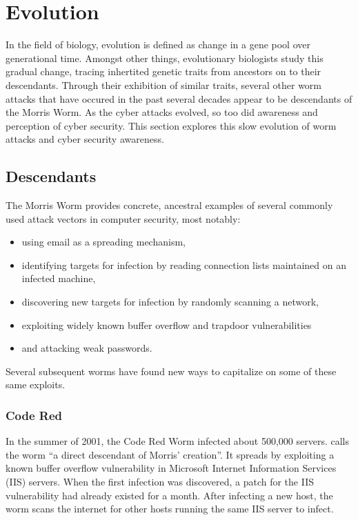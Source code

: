 \section*{Evolution}
In the field of biology, evolution is defined as change in a gene pool over
generational time. Amongst other things, evolutionary biologists study this
gradual change, tracing inhertited genetic traits from ancestors on to
their descendants. Through their exhibition of similar traits, several
other worm attacks that have occured in the past several decades appear to be
descendants of the Morris Worm. As the cyber attacks evolved, so
too did awareness and perception of cyber security. This section explores this
slow evolution of worm attacks and cyber security awareness.

\subsection*{Descendants}
The Morris Worm provides concrete, ancestral examples of several commonly used
attack vectors in computer security, most notably:
\begin{itemize}
  \item using email as a spreading mechanism,
  \item identifying targets for infection by reading connection lists maintained
  on an infected machine,
  \item discovering new targets for infection by randomly scanning a network,
  \item exploiting widely known buffer overflow and trapdoor vulnerabilities
  \item and attacking weak passwords.
\end{itemize}
Several subsequent worms have found new ways to capitalize on some of these same
exploits.
\subsubsection*{Code Red}
In the summer of 2001, the Code Red Worm infected about 500,000 servers.
\cite{fisher_living_2002} calls
the worm ``a direct descendant of Morris' creation''.
It spreads by exploiting a known buffer overflow vulnerability in Microsoft
Internet Information Services (IIS) servers. When the first infection was
discovered, a patch for the IIS vulnerability had already existed for a
month\cite{fisher_code_2001}. After infecting a new host, the worm scans the
internet for other hosts running the same IIS server to infect. 

